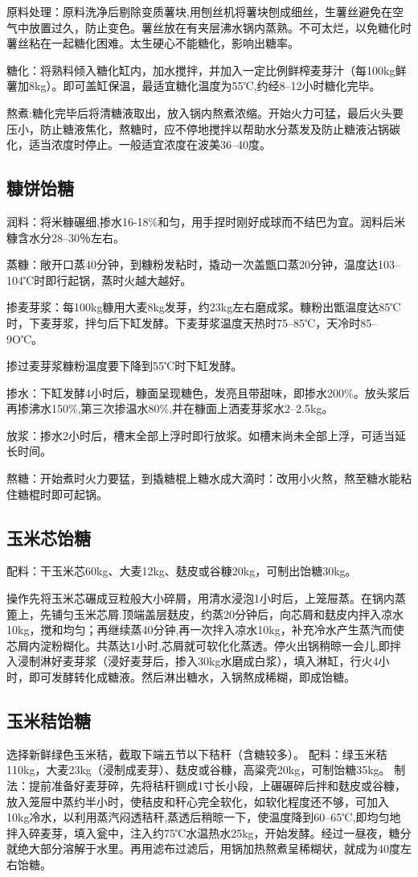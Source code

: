 \documentclass{ctexbook}
\begin{document}
原料处理：原料洗净后剔除变质薯块,用刨丝机将薯块刨成细丝，生薯丝避免在空气中放置过久，防止变色。薯丝放在有夹层沸水锅内蒸熟。不可太烂，以免糖化时薯丝粘在一起糖化困难。太生硬心不能糖化，影响出糖率。

糖化：将熟料倾入糖化缸内，加水搅拌，并加入一定比例鲜榨麦芽汁（每100kg鲜薯加8kg）。即可盖缸保温，最适宜糖化温度为55℃,约经8--12小时糖化完毕。

熬煮:糖化完毕后将清糖液取出，放入锅内熬煮浓缩。开始火力可猛，最后火头要压小，防止糖液焦化，熬糖时，应不停地搅拌以帮助水分蒸发及防止糖液沾锅碳化，适当浓度时停止。一般适宜浓度在波美36--40度。
\subsection{糠饼饴糖}
润料：将米糠碾细,掺水16-18\%和匀，用手捏时刚好成球而不结巴为宜。润料后米糠含水分28--30％左右。

蒸糠：敞开口蒸40分钟，到糠粉发粘时，撬动一次盖甑口蒸20分钟，温度达103--104℃时即行起锅，蒸时火越大越好。

掺麦芽浆：每100kg糠用大麦8kg发芽，约23kg左右磨成浆。糠粉出甑温度达85℃时，下麦芽浆，拌匀后下缸发酵。下麦芽浆温度天热时75--85℃，天冷时85--9O℃。

掺过麦芽浆糠粉温度要下降到55℃时下缸发酵。

掺水：下缸发酵4小时后，糠面呈现糖色，发亮且带甜味，即掺水200\%。放头浆后再掺沸水150\%,第三次掺温水80\%,并在糠面上洒麦芽浆水2--2.5kg。

放浆：掺水2小时后，槽末全部上浮时即行放浆。如槽末尚未全部上浮，可适当延长时间。

熬糖：开始煮时火力要猛，到撬糖棍上糖水成大滴时：改用小火熬，熬至糖水能粘住糖棍时即可起锅。
\subsection{玉米芯饴糖}
配料：干玉米芯60kg、大麦12kg、麸皮或谷糠20kg，可制出饴糖30kg。

操作先将玉米芯碾成豆粒般大小碎屑，用清水浸泡1小时后，上笼屉蒸。在锅内蒸篦上，先铺匀玉米芯屑.顶端盖层麸皮，约蒸20分钟后，向芯屑和麸皮内拌入凉水10kg，搅和均匀；再继续蒸40分钟,再一次拌入凉水10kg，补充冷水产生蒸汽而使芯屑内淀粉糊化。共蒸达1小时,芯屑就可软化化蒸透。停火出锅稍晾一会儿,即拌入浸制淋好麦芽浆（浸好麦芽后，掺入30kg水磨成白浆），填入淋缸，行火4小时，即可发酵转化成糖液。然后淋出糖水，入锅熬成稀糊，即成饴糖。
\subsection{玉米秸饴糖}
选择新鲜绿色玉米秸，截取下端五节以下秸秆（含糖较多）。
配料：绿玉米秸110kg，大麦23kg（浸制成麦芽）、麸皮或谷糠，高粱壳20kg，可制饴糖35kg。
制法：提前准备好麦芽碎，先将秸秆铡成1寸长小段，上碾碾碎后拌和麸皮或谷糠，放入笼屉中蒸约半小时，使秸皮和秆心完全软化，如软化程度还不够，可加入10kg冷水，以利用蒸汽闷透秸秆,蒸透后稍晾一下，使温度降到60--65℃,即均匀地拌入碎麦芽，填入瓮中，注入约75℃水温热水25kg，开始发酵。经过一昼夜，糖分就绝大部分溶解于水里。再用滤布过滤后，用锅加热熬煮呈稀糊状，就成为40度左右饴糖。
\end{document}
